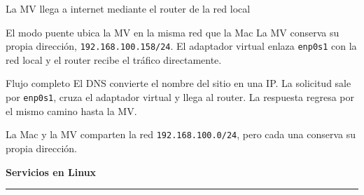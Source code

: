 \documentclass[aspectratio=169,10pt,c]{beamer}
\begin{document}
\begin{frame}{La MV llega a internet mediante el router de la red local}
\begin{block}{El modo puente ubica la MV en la misma red que la Mac}
\small La MV conserva su propia dirección, \texttt{192.168.100.158/24}. El adaptador virtual enlaza \texttt{enp0s1} con la red local y el router recibe el tráfico directamente.
\end{block}
\begin{center}
\end{center}
\begin{alertblock}{Flujo completo}
\small El DNS convierte el nombre del sitio en una IP. La solicitud sale por \texttt{enp0s1}, cruza el adaptador virtual y llega al router. La respuesta regresa por el mismo camino hasta la MV.
\end{alertblock}
\scriptsize La Mac y la MV comparten la red \texttt{192.168.100.0/24}, pero cada una conserva su propia dirección.
\end{frame}

\begin{frame}[plain]
\vfill
\begin{center}
{\fontsize{29}{34}\selectfont\bfseries Servicios en Linux}\par
\vspace{4mm}
{\color{utpRojo}\rule{8.5cm}{1.2pt}}
\end{center}
\vfill
\end{frame}
\end{document}
